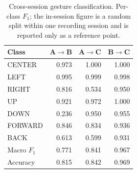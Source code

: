 \begin{table}[t]
\caption{Cross-session gesture classification. Per-class $F_1$; the in-session figure is a random split within one recording session and is reported only as a reference point.}
\label{tab:crosssession}
\centering
\begin{tabular}{lrrr}
\toprule
Class & A$\rightarrow$B & A$\rightarrow$C & B$\rightarrow$C \\
\midrule
CENTER & 0.973 & 1.000 & 1.000 \\
LEFT & 0.995 & 0.999 & 0.998 \\
RIGHT & 0.816 & 0.534 & 0.950 \\
UP & 0.921 & 0.972 & 1.000 \\
DOWN & 0.236 & 0.950 & 0.955 \\
FORWARD & 0.846 & 0.834 & 0.936 \\
BACK & 0.613 & 0.599 & 0.931 \\
\midrule
Macro $F_1$ & 0.771 & 0.841 & 0.967 \\
Accuracy & 0.815 & 0.842 & 0.969 \\
\bottomrule
\end{tabular}
\end{table}
